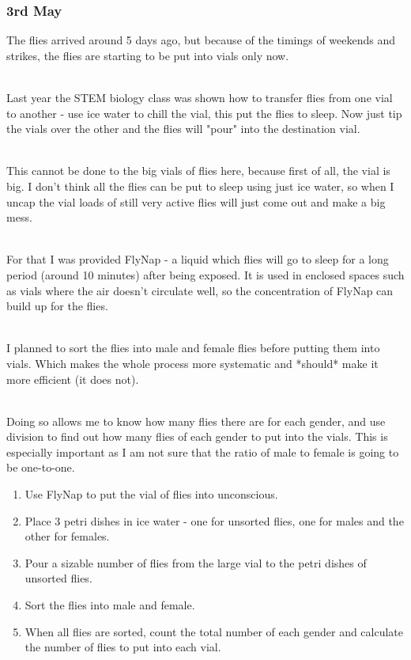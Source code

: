 \documentclass{article}
\begin{document}
\subsubsection{3rd May}

The flies arrived around 5 days ago, but because of the timings of weekends and strikes, the flies are starting to be put into vials only now.

\noindent\\
Last year the STEM biology class was shown how to transfer flies from one vial to another - use ice water to chill the vial, this put the flies to sleep. Now just tip the vials over the other and the flies will "pour" into the destination vial.

\noindent\\
This cannot be done to the big vials of flies here, because first of all, the vial is big. I don't think all the flies can be put to sleep using just ice water, so when I uncap the vial loads of still very active flies will just come out and make a big mess.

\noindent\\
For that I was provided FlyNap - a liquid which flies will go to sleep for a long period (around 10 minutes) after being exposed. It is used in enclosed spaces such as vials where the air doesn't circulate well, so the concentration of FlyNap can build up for the flies.

\noindent\\
I planned to sort the flies into male and female flies before putting them into vials. Which makes the whole process more systematic and *should* make it more efficient (it does not).

\noindent\\
Doing so allows me to know how many flies there are for each gender, and use division to find out how many flies of each gender to put into the vials. This is especially important as I am not sure that the ratio of male to female is going to be one-to-one.

\begin{enumerate}
  \item Use FlyNap to put the vial of flies into unconscious.
  \item Place 3 petri dishes in ice water - one for unsorted flies, one for males and the other for females.
  \item Pour a sizable number of flies from the large vial to the petri dishes of unsorted flies.
  \item Sort the flies into male and female.
  \item When all flies are sorted, count the total number of each gender and calculate the number of flies to put into each vial.
\end{enumerate}
\end{document}
